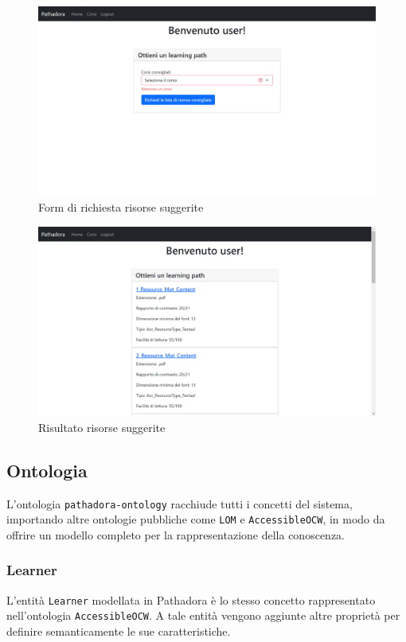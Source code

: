 \begin{figure}[H]
\centering
\includegraphics[scale=0.4]{res/resources-generation.png}
\caption{Form di richiesta risorse suggerite}
\label{fig:resources-generation}
\end{figure}

\begin{figure}[H]
\centering
\includegraphics[scale=0.4]{res/path-result.png}
\caption{Risultato risorse suggerite}
\label{fig:resources-generation}
\end{figure}

\subsection{Ontologia}
L'ontologia \texttt{pathadora-ontology} racchiude tutti i concetti del sistema, importando altre ontologie pubbliche come \texttt{LOM} e \texttt{AccessibleOCW}, in modo da offrire un modello completo per la rappresentazione della conoscenza.

\subsubsection{Learner}
L'entità \texttt{Learner} modellata in Pathadora è lo stesso concetto rappresentato nell'ontologia \texttt{AccessibleOCW}. A tale entità vengono aggiunte altre proprietà per definire semanticamente le sue caratteristiche.

